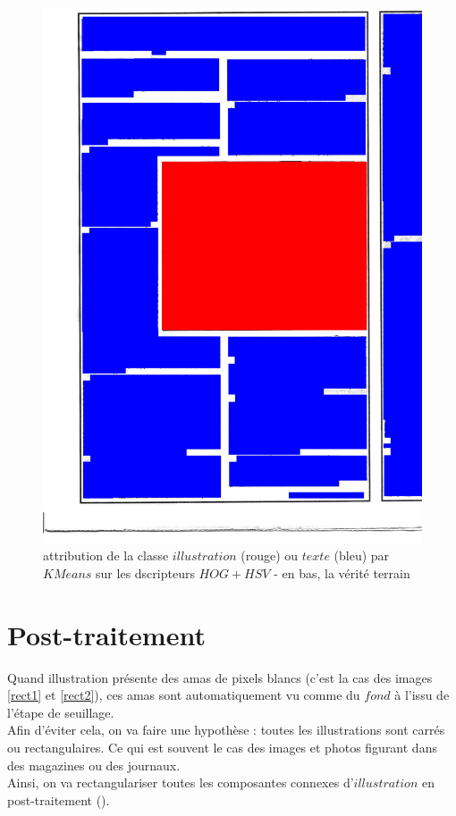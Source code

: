 \documentclass{book}
\begin{document}
\begin{figure}[H]
\begin{center}
\includegraphics[scale=0.3]{images/1g_m.jpg}
\end{center}
\caption{attribution de la classe $illustration$ (rouge) ou $texte$ (bleu) par $KMeans$ sur les dscripteurs $HOG+HSV$ - en bas, la vérité terrain}
\label{resultat}
\end{figure}

\chapter{Post-traitement}

Quand illustration présente des amas de pixels blancs (c'est la cas des images \ref{rect1} et \ref{rect2}), ces amas sont automatiquement vu comme du $fond$ à l'issu de l'étape
de seuillage.\\
Afin d'éviter cela, on va faire une hypothèse : toutes les illustrations sont carrés ou rectangulaires. Ce qui est souvent le cas des images et photos
figurant dans des magazines ou des journaux.\\
Ainsi, on va \og rectangulariser \fg toutes les composantes connexes d'$illustration$ en post-traitement ().\\
\end{document}

